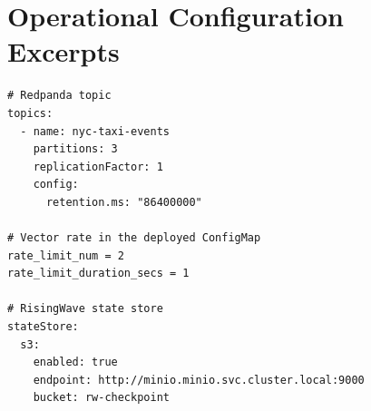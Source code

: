 \section{Operational Configuration Excerpts}\label{app:config}
\begin{lstlisting}
# Redpanda topic
topics:
  - name: nyc-taxi-events
    partitions: 3
    replicationFactor: 1
    config:
      retention.ms: "86400000"

# Vector rate in the deployed ConfigMap
rate_limit_num = 2
rate_limit_duration_secs = 1

# RisingWave state store
stateStore:
  s3:
    enabled: true
    endpoint: http://minio.minio.svc.cluster.local:9000
    bucket: rw-checkpoint
\end{lstlisting}
